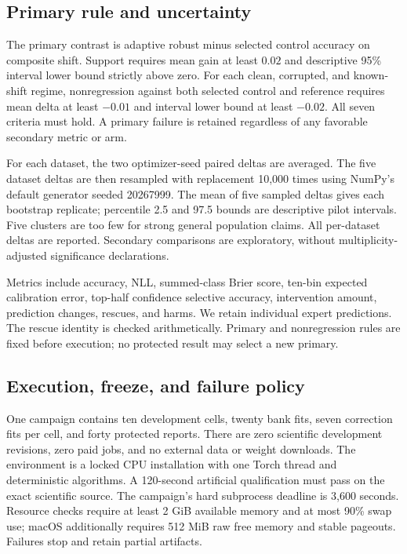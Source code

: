 \subsection{Primary rule and uncertainty}
The primary contrast is adaptive robust minus selected control accuracy on
composite shift. Support requires mean gain at least $0.02$ and descriptive
95\% interval lower bound strictly above zero. For each clean, corrupted, and
known-shift regime, nonregression against both selected control and reference
requires mean delta at least $-0.01$ and interval lower bound at least $-0.02$.
All seven criteria must hold. A primary failure is retained regardless of any
favorable secondary metric or arm.

For each dataset, the two optimizer-seed paired deltas are averaged. The five
dataset deltas are then resampled with replacement 10,000 times using NumPy's
default generator seeded 20267999. The mean of five sampled deltas gives each
bootstrap replicate; percentile 2.5 and 97.5 bounds are descriptive pilot
intervals. Five clusters are too few for strong general population claims.
All per-dataset deltas are reported. Secondary comparisons are exploratory,
without multiplicity-adjusted significance declarations.

Metrics include accuracy, NLL, summed-class Brier score, ten-bin expected
calibration error, top-half confidence selective accuracy, intervention amount,
prediction changes, rescues, and harms. We retain individual expert predictions.
The rescue identity is checked arithmetically. Primary and nonregression rules
are fixed before execution; no protected result may select a new primary.

\subsection{Execution, freeze, and failure policy}
One campaign contains ten development cells, twenty bank fits, seven correction
fits per cell, and forty protected reports. There are zero scientific
development revisions, zero paid jobs, and no external data or weight downloads.
The environment is a locked CPU installation with one Torch thread and
deterministic algorithms. A 120-second artificial qualification must pass on
the exact scientific source. The campaign's hard subprocess deadline is
3,600 seconds. Resource checks require at least 2 GiB available memory and at
most 90\% swap use; macOS additionally requires 512 MiB raw free memory and
stable pageouts. Failures stop and retain partial artifacts.

